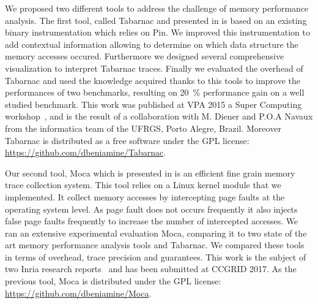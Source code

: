 We proposed two different tools to address the challenge of memory performance analysis.
The first tool, called \gls{Tabarnac} and presented in  is based on an existing binary instrumentation which relies on \gls{Pin}.
We improved this instrumentation to add contextual information allowing to determine on which data structure the memory accesses occured.
Furthermore we designed several comprehensive visualization to interpret \gls{Tabarnac} traces.
Finally we evaluated the overhead of \gls{Tabarnac} and used the knowledge acquired thanks to this tools to improve the performances of two benchmarks, resulting on \SI{20}{\%} performance gain on a well studied benchmark.
This work was published at \gls{VPA} 2015 a Super Computing workshop~\cite{Beniamine15TABARNAC}, and is the result of a collaboration with M. Diener and P.O.A Navaux from the informatica team of the \gls{UFRGS}, Porto Alegre, Brazil.
Moreover \gls{Tabarnac} is distributed as a free software under the \gls{GPL} license:\\
\url{https://github.com/dbeniamine/Tabarnac}.

Our second tool, \gls{Moca} which is presented in  is an efficient fine grain memory trace collection system.
This tool relies on a \gls{Linux} kernel module that we implemented.
It collect memory accesses by intercepting page faults at the operating system level.
As page fault does not occurs frequently it also injects false page faults frequently to increase the number of intercepted accesses.
We ran an extensive experimental evaluation \gls{Moca}, comparing it to two state of the art memory performance analysis tools and \gls{Tabarnac}.
We compared these tools in terms of overhead, trace precision and guarantees.
This work is the subject of two Inria research reports~\cite{Beniamine15Memory,Beniamine16Moca} and has been submitted at \gls{CCGRID} 2017.
As the previous tool, \gls{Moca} is distributed under the \gls{GPL} license:\\
\url{https://github.com/dbeniamine/Moca}.

